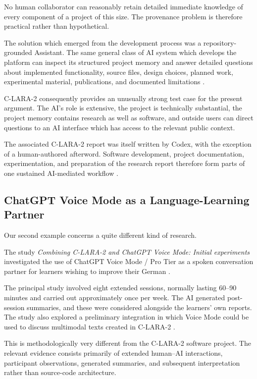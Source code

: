 No human collaborator can reasonably retain detailed immediate knowledge of every component of a project of this size. The provenance problem is therefore practical rather than hypothetical.

The solution which emerged from the development process was a repository-grounded Assistant. The same general class of AI system which develops the platform can inspect its structured project memory and answer detailed questions about implemented functionality, source files, design choices, planned work, experimental material, publications, and documented limitations \citep[Section~9]{bediEtAl2026clara2}.

C-LARA-2 consequently provides an unusually strong test case for the present argument. The AI's role is extensive, the project is technically substantial, the project memory contains research as well as software, and outside users can direct questions to an AI interface which has access to the relevant public context.

The associated C-LARA-2 report was itself written by Codex, with the exception of a human-authored afterword. Software development, project documentation, experimentation, and preparation of the research report therefore form parts of one sustained AI-mediated workflow \citep[Abstract]{bediEtAl2026clara2}.


\subsection{ChatGPT Voice Mode as a Language-Learning Partner}

Our second example concerns a quite different kind of research.

The study \emph{Combining C-LARA-2 and ChatGPT Voice Mode: Initial experiments} investigated the use of ChatGPT Voice Mode / Pro Tier as a spoken conversation partner for learners wishing to improve their German \citep{wrightEtAl2026voice}.

The principal study involved eight extended sessions, normally lasting 60--90 minutes and carried out approximately once per week. The AI generated post-session summaries, and these were considered alongside the learners' own reports. The study also explored a preliminary integration in which Voice Mode could be used to discuss multimodal texts created in C-LARA-2 \citep[Sections~3--4]{wrightEtAl2026voice}.

This is methodologically very different from the C-LARA-2 software project. The relevant evidence consists primarily of extended human--AI interactions, participant observations, generated summaries, and subsequent interpretation rather than source-code architecture.

